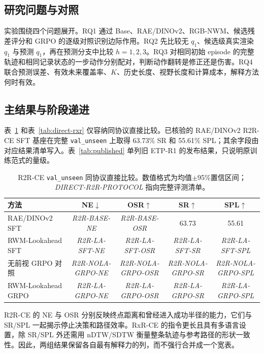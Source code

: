 \documentclass[UTF8,11pt]{ctexart}
\newcommand{\method}{RWM-Lookahead}
\begin{document}
\subsection{研究问题与对照}

实验围绕四个问题展开。RQ1 通过 Base、RAE/DINOv2、RGB-NWM、候选残差评分和 GRPO 的逐级对照识别边际作用。RQ2 先比较无 $q_1$、候选级真实渲染 $q_1$ 与预测 $q_1$，再在预测分支中比较 $h=1,2,3$。RQ3 对相同初始 episode 的完整轨迹和相同记录状态的一步动作分别配对，判断动作翻转是修正还是伤害。RQ4 联合预测误差、有效未来覆盖率、$K$、历史长度、视野长度和计算成本，解释方法何时有效。

\subsection{主结果与阶段递进}

表~\ref{tab:direct-r2r} 和表~\ref{tab:direct-rxr} 仅容纳同协议直接比较。已核验的 RAE/DINOv2 R2R-CE SFT 基座在完整 \texttt{val\_unseen} 上取得 63.73\% SR 和 55.61\% SPL；其余字段由对应结果清单写入。表~\ref{tab:published} 单列旧 ETP-R1 的发布结果，只说明原训练范式的量级。

\begin{table}[t]
\centering
\caption{R2R-CE \texttt{val\_unseen} 同协议直接比较。数值格式为均值$\pm$95\%置信区间；\textit{DIRECT-R2R-PROTOCOL} 指向完整评测清单。}
\label{tab:direct-r2r}
\begin{tabular}{lcccc}
\toprule
方法 & NE$\downarrow$ & OSR$\uparrow$ & SR$\uparrow$ & SPL$\uparrow$ \\
\midrule
RAE/DINOv2 SFT & \textit{R2R-BASE-NE} & \textit{R2R-BASE-OSR} & 63.73 & 55.61 \\
\method{} SFT & \textit{R2R-LA-SFT-NE} & \textit{R2R-LA-SFT-OSR} & \textit{R2R-LA-SFT-SR} & \textit{R2R-LA-SFT-SPL} \\
无前视 GRPO 对照 & \textit{R2R-NOLA-GRPO-NE} & \textit{R2R-NOLA-GRPO-OSR} & \textit{R2R-NOLA-GRPO-SR} & \textit{R2R-NOLA-GRPO-SPL} \\
\method{} GRPO & \textit{R2R-LA-GRPO-NE} & \textit{R2R-LA-GRPO-OSR} & \textit{R2R-LA-GRPO-SR} & \textit{R2R-LA-GRPO-SPL} \\
\bottomrule
\end{tabular}
\end{table}

R2R-CE 的 NE 与 OSR 分别反映终点距离和曾经进入成功半径的能力，它们与 SR/SPL 一起揭示停止决策和路径效率。RxR-CE 的指令更长且具有多语言设置，除 SR/SPL 外还需用 nDTW/SDTW 衡量整条轨迹与参考路径的形状一致性。因此，两组结果保留各自最有解释力的列，而不强行合并成一个宽表。
\end{document}
